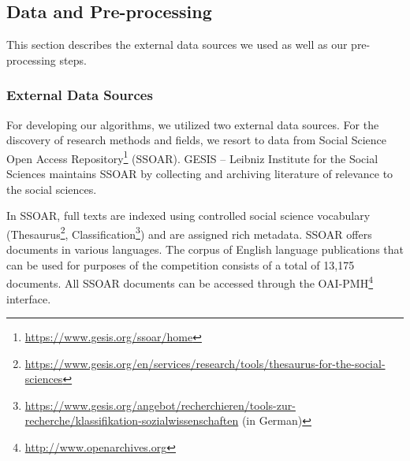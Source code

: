 \subsection{Data and Pre-processing}
This section describes the external data sources we used as well as our pre-processing steps.


\subsubsection{External Data Sources}
\label{section:external_data_sources}
For developing our algorithms, we utilized two external data sources. For the discovery of research methods and fields, we resort to data from Social Science Open Access Repository\footnote{\url{https://www.gesis.org/ssoar/home}} (SSOAR). 
GESIS – Leibniz Institute for the Social Sciences maintains  SSOAR by collecting and archiving literature of relevance to the social sciences. 

In SSOAR, full texts are indexed using controlled social science vocabulary (Thesaurus\footnote{\url{https://www.gesis.org/en/services/research/tools/thesaurus-for-the-social-sciences}}, Classification\footnote{\url{https://www.gesis.org/angebot/recherchieren/tools-zur-recherche/klassifikation-sozialwissenschaften} (in German)}) and are assigned rich metadata. SSOAR offers documents in various languages. The corpus of English language publications that can be used for purposes of the competition consists of a total of 13,175 documents. All SSOAR documents can be accessed through the OAI-PMH\footnote{{\url{http://www.openarchives.org}}} interface. 

